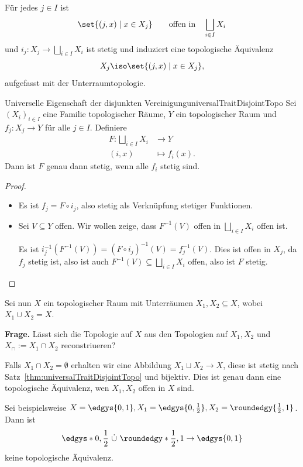 \documentclass[language=ngerman]{TemplateLecture} %
\begin{document}
\begin{remark}
    Für jedes $j \in I$ ist 
    \begin{equation*}
        \set{(j,x) \mid x \in X_j} \quad \quad \text{offen in} \quad \bigsqcup_{i \in I} X_i
    \end{equation*}
    und $i_j: X_j \to \bigsqcup_{i \in I} X_i$ ist stetig und induziert eine topologische Äquivalenz 
    \begin{equation*}
        X_j \iso \set{(j,x) \mid x \in X_j},
    \end{equation*}
    aufgefasst mit der Unterraumtopologie.
\end{remark}

\begin{thm}{Universelle Eigenschaft der disjunkten Vereinigung}{universalTraitDisjointTopo}
    Sei $(X_i)_{i \in  I}$ eine Familie topologischer Räume, $Y$ ein topologischer Raum und $f_j: X_j \to Y$ für alle $j \in I$. Definiere 
    \begin{align*}
        F: \bigsqcup_{i \in I} X_i & \to Y \\
        (i,x) &\mapsto f_i(x).
    \end{align*}
    Dann ist $F$ genau dann stetig, wenn alle $f_i$ stetig sind.
\end{thm}
\begin{proof}\leavevmode
    \begin{itemize}
        \item[\enquote{$\Rightarrow$}:] Es ist $f_j = F \circ i_j$, also stetig als Verknüpfung stetiger Funktionen.
        \item[\enquote{$\Leftarrow$}:] Sei $V \subseteq Y$ offen. Wir wollen zeige, dass $F^{-1}(V)$ offen in $\bigsqcup_{i \in I} X_i$ offen ist. 

        Es ist $i_j^{-1}(F^{-1}(V)) = (F \circ i_j)^{-1}(V) = f_j^{-1}(V)$. Dies ist offen in $X_j$, da $f_j$ stetig ist, also ist auch $F^{-1}(V) \subseteq \bigsqcup_{i \in I} X_i$ offen, also ist $F$ stetig.
    \end{itemize}
\end{proof}

Sei nun $X$ ein topologischer Raum mit Unterräumen $X_1, X_2 \subseteq X$, wobei $X_1 \cup X_2 = X$.

\textbf{Frage.} Lässt sich die Topologie auf $X$ aus den Topologien auf $X_1, X_2$ und $X_\cap := X_1 \cap X_2$ reconstriueren?

\begin{example}
    Falls $X_1 \cap X_2 = \emptyset$ erhalten wir eine Abbildung $X_1 \sqcup X_2 \to X$, diese ist stetig nach Satz~\ref{thm:universalTraitDisjointTopo} und bijektiv. Dies ist genau dann eine topologische Äquivalenz, wen $X_1, X_2$ offen in $X$ sind.

    Sei beispielsweise $X = \edgys{0,1}, X_1 = \edgys{0,\frac{1}{2}}, X_2 = \roundedgy{\frac{1}{2},1}$. Dann ist 
    \begin{equation*}
        \edgys*{0,\frac{1}{2}}~\dot{\cup}~\roundedgy*{\frac{1}{2},1} \to \edgys{0,1}
    \end{equation*}
    keine topologische Äquivalenz.
\end{example}
\end{document}
